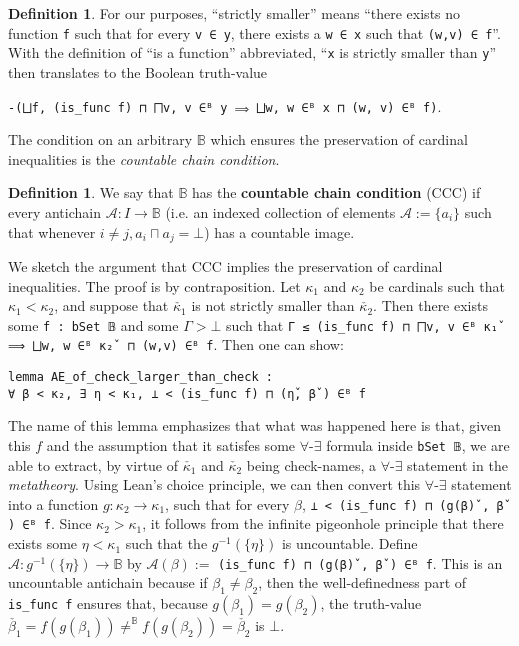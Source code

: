\documentclass[a4paper,USenglish,cleveref, autoref]{lipics-v2019}
\newcommand{\B}{\mathbb{B}}
\newcommand{\lil}{\lstinline}
\theoremstyle{definition}
\newtheorem{defn}[theorem]{Definition}
\begin{document}
\begin{defn}
  For our purposes, ``strictly smaller'' means ``there exists no function \lil{f} such that for every \lil{v ∈ y}, there exists a \lil{w ∈ x} such that \lil{(w,v) ∈ f}''. With the definition of ``is a function'' abbreviated, ``\lil{x} is strictly smaller than \lil{y}'' then translates to the Boolean truth-value
\begin{center}\lstinline{-(⨆f, (is_func f) ⊓ ⨅v, v ∈ᴮ y ⟹ ⨆w, w ∈ᴮ x ⊓ (w, v) ∈ᴮ f)}.\end{center}
\end{defn}

The condition on an arbitrary $\B$ which ensures the preservation of cardinal inequalities is the \emph{countable chain condition}.

\begin{defn}
We say that $\B$ has the \textbf{countable chain condition} (CCC) if every antichain $\mathcal{A} : I \to \B$ (i.e. an indexed collection of elements $\mathcal{A} := \{a_i\}$ such that whenever $i \neq j, a_i \sqcap a_j = \bot$) has a countable image.
\end{defn}

We sketch the argument that CCC implies the preservation of cardinal inequalities. The proof is by contraposition. Let $\kappa_1$ and $\kappa_2$ be cardinals such that $\kappa_1 < \kappa_2$, and suppose that $\check{\kappa_1}$ is not strictly smaller than $\check{\kappa_2}$. Then there exists some \lil{f : bSet 𝔹} and some $\Gamma > \bot$ such that \lstinline{Γ ≤ (is_func f) ⊓ ⨅v, v ∈ᴮ κ₁̌  ⟹ ⨆w, w ∈ᴮ κ₂̌  ⊓ (w,v) ∈ᴮ f}. Then one can show:
\begin{lstlisting}
lemma AE_of_check_larger_than_check :
∀ β < κ₂, ∃ η < κ₁, ⊥ < (is_func f) ⊓ (η̌, β̌ ) ∈ᴮ f
\end{lstlisting}
The name of this lemma emphasizes that what was happened here is that, given this $f$ and the assumption that it satisfes some $\forall$-$\exists$ formula inside \lil{bSet 𝔹}, we are able to extract, by virtue of $\check{\kappa_1}$ and $\check{\kappa_2}$ being check-names, a $\forall$-$\exists$ statement in the \emph{metatheory}. Using Lean's choice principle, we can then convert this $\forall$-$\exists$ statement into a function $g : \kappa_2 \to \kappa_1$, such that for every $\beta$, \lstinline{⊥ < (is_func f) ⊓ (g(β)̌ , β̌ ) ∈ᴮ f}. Since $\kappa_2 > \kappa_1$, it follows from the infinite pigeonhole principle that there exists some $\eta < \kappa_1$ such that the $g^{-1}(\{\eta\})$ is uncountable. Define $\mathcal{A} : g^{-1}(\{\eta\}) \to \B$ by $\mathcal{A}(\beta) :=$ \lil{(is_func f) ⊓ (g(β)̌ , β̌ ) ∈ᴮ f}. This is an uncountable antichain because if $\beta_1 \neq \beta_2$, then the well-definedness part of \lil{is_func f} ensures that, because $g(\beta_1) = g(\beta_2)$, the truth-value $\check{\beta_1} = f(g(\beta_1)) \neq^\B f(g(\beta_2)) = \check{\beta_2}$ is $\bot$.
\end{document}

